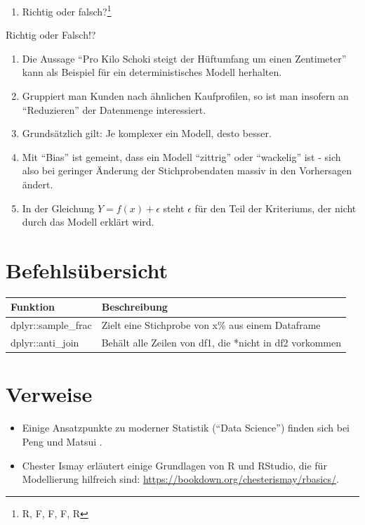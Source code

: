 \documentclass[12pt,ngerman,]{book}
\providecommand{\tightlist}{%
  \setlength{\itemsep}{0pt}\setlength{\parskip}{0pt}}
\let\rmarkdownfootnote\footnote%
\def\footnote{\protect\rmarkdownfootnote}
\let\BeginKnitrBlock\begin \let\EndKnitrBlock\end
\begin{document}
\begin{enumerate}
\def\labelenumi{\arabic{enumi}.}
\setcounter{enumi}{3}
\tightlist
\item
  Richtig oder falsch?\footnote{R, F, F, F, R}
\end{enumerate}

\BeginKnitrBlock{rmdexercises}
Richtig oder Falsch!?

\begin{enumerate}
\def\labelenumi{\arabic{enumi}.}
\tightlist
\item
  Die Aussage ``Pro Kilo Schoki steigt der Hüftumfang um einen
  Zentimeter'' kann als Beispiel für ein deterministisches Modell
  herhalten.
\item
  Gruppiert man Kunden nach ähnlichen Kaufprofilen, so ist man insofern
  an ``Reduzieren'' der Datenmenge interessiert.
\item
  Grundsätzlich gilt: Je komplexer ein Modell, desto besser.
\item
  Mit ``Bias'' ist gemeint, dass ein Modell ``zittrig'' oder
  ``wackelig'' ist - sich also bei geringer Änderung der
  Stichprobendaten massiv in den Vorhersagen ändert.
\item
  In der Gleichung \(Y=f(x)+\epsilon\) steht \(\epsilon\) für den Teil
  der Kriteriums, der nicht durch das Modell erklärt wird.
\end{enumerate}
\EndKnitrBlock{rmdexercises}

\section{Befehlsübersicht}\label{befehlsubersicht-6}

\begin{longtable}[]{@{}ll@{}}
\toprule
Funktion & Beschreibung\tabularnewline
\midrule
\endhead
dplyr::sample\_frac & Zielt eine Stichprobe von x\% aus einem
Dataframe\tabularnewline
dplyr::anti\_join & Behält alle Zeilen von df1, die *nicht in df2
vorkommen\tabularnewline
\bottomrule
\end{longtable}

\section{Verweise}\label{verweise-5}

\begin{itemize}
\item
  Einige Ansatzpunkte zu moderner Statistik (``Data Science'') finden
  sich bei Peng und Matsui \citeyearpar{peng2015art}.
\item
  Chester Ismay erläutert einige Grundlagen von R und RStudio, die für
  Modellierung hilfreich sind:
  \url{https://bookdown.org/chesterismay/rbasics/}.
\end{itemize}
\end{document}
